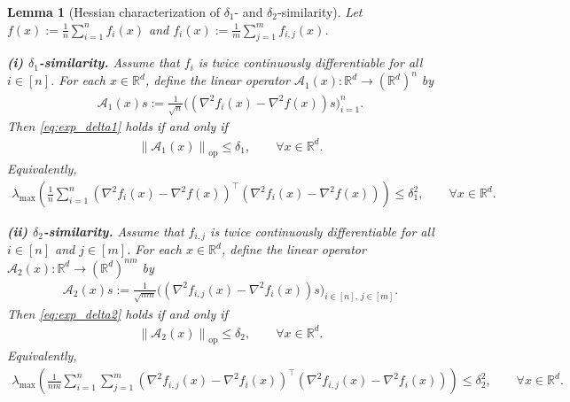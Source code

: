 \documentclass[10pt,a4paper]{amsart}
\newtheorem{lemma}{Lemma}
\newcommand{\R}{\bb R}
\newcommand{\bb}{\mathbb}
\newcommand{\eqdef}{:=}
\newcommand{\op}{\operatorname{op}}
\newcommand{\opnorm}[1]{\left\| #1 \right\|_{\op}}      %
\newcommand{\rb}[1]{\left(#1\right)}
\begin{document}
\begin{lemma}[Hessian characterization of $\delta_1$- and $\delta_2$-similarity]
\label{lem:hessian_characterization_delta}
Let $f(x)\eqdef \frac{1}{n}\sum_{i=1}^n f_i(x)$ and
$f_i(x)\eqdef \frac{1}{m}\sum_{j=1}^m f_{i,j}(x)$.

\smallskip
\noindent
\textbf{(i) $\delta_1$-similarity.}
Assume that $f_i$ is twice continuously differentiable for all $i\in[n]$.
For each $x\in\R^d$, define the linear operator
$\mathcal{A}_1(x):\R^d\to(\R^d)^n$ by
\begin{align}
    \mathcal{A}_1(x)s
    \eqdef
    \frac{1}{\sqrt n}
    \big(
    (\nabla^2 f_i(x)-\nabla^2 f(x))s
    \big)_{i=1}^n .
    \label{eq:A1_definition}
\end{align}
Then \eqref{eq:exp_delta1} holds if and only if
\begin{align}
    \opnorm{\mathcal{A}_1(x)}\le \delta_1,
    \qquad
    \forall x\in\R^d .
    \label{eq:hess_delta1_stacked_opnorm}
\end{align}
Equivalently,
\begin{align}
    \lambda_{\max}\rb{
    \frac1n\sum_{i=1}^n
    \rb{\nabla^2 f_i(x)-\nabla^2 f(x)}^\top
    \rb{\nabla^2 f_i(x)-\nabla^2 f(x)}
    }
    \le \delta_1^2,
    \qquad
    \forall x\in\R^d .
    \label{eq:hess_delta1_spectral}
\end{align}

\smallskip
\noindent
\textbf{(ii) $\delta_2$-similarity.}
Assume that $f_{i,j}$ is twice continuously differentiable for all
$i\in[n]$ and $j\in[m]$.
For each $x\in\R^d$, define the linear operator
$\mathcal{A}_2(x):\R^d\to(\R^d)^{nm}$ by
\begin{align}
    \mathcal{A}_2(x)s
    \eqdef
    \frac{1}{\sqrt{nm}}
    \big(
    (\nabla^2 f_{i,j}(x)-\nabla^2 f_i(x))s
    \big)_{i\in[n],\,j\in[m]} .
    \label{eq:A2_definition}
\end{align}
Then \eqref{eq:exp_delta2} holds if and only if
\begin{align}
    \opnorm{\mathcal{A}_2(x)}\le \delta_2,
    \qquad
    \forall x\in\R^d .
    \label{eq:hess_delta2_stacked_opnorm}
\end{align}
Equivalently,
\begin{align}
    \lambda_{\max}\rb{
    \frac1{nm}\sum_{i=1}^n\sum_{j=1}^m
    \rb{\nabla^2 f_{i,j}(x)-\nabla^2 f_i(x)}^\top
    \rb{\nabla^2 f_{i,j}(x)-\nabla^2 f_i(x)}
    }
    \le \delta_2^2,
    \qquad
    \forall x\in\R^d .
    \label{eq:hess_delta2_spectral}
\end{align}
\end{lemma}
\end{document}
